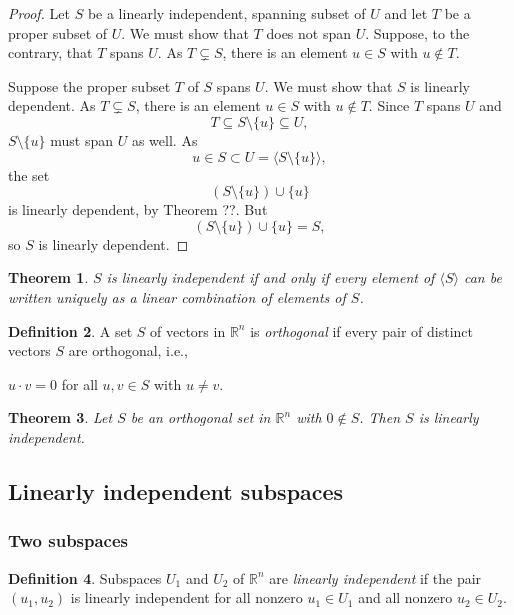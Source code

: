 \documentclass{amsart}
\newcommand{\RR}{\mathbb{R}}
\newtheorem{theorem}{Theorem}[section]
\theoremstyle{definition}
\newtheorem{definition}[theorem]{Definition}
\begin{document}
\begin{proof}
Let $S$ be a linearly independent, spanning subset of $U$ and let $T$ be a proper subset of $U$.
We must show that $T$ does not span $U$.
Suppose, to the contrary, that $T$ spans $U$.
As $T\subsetneq S$, there is an element $u\in S$ with $u\notin T$.


Suppose the proper subset $T$ of $S$ spans $U$.
We must show that $S$ is linearly dependent.
As $T\subsetneq S$, there is an element $u\in S$ with $u\notin T$.
Since $T$ spans $U$ and
$$T\subseteq S\setminus \{u\}\subseteq U,$$
$S\setminus \{u\}$ must span $U$ as well.
As $$u\in S\subset U = \langle S\setminus \{u\}\rangle,$$
the set
\[
\left(S\setminus \{u\}\right)\cup \{u\}
\]
is linearly dependent, by Theorem ??.
But
\[
\left(S\setminus \{u\}\right)\cup \{u\}=S,
\]
so $S$ is linearly dependent.
\end{proof}


\begin{theorem}
  $S$ is linearly independent if and only if every element of $\langle S\rangle$ can be written uniquely as a linear combination of elements of $S$.
\end{theorem}

\begin{definition}
  A set $S$ of vectors in $\RR^n$ is \emph{orthogonal} if every pair of distinct vectors $S$ are orthogonal, i.e.,
  \begin{center}
    $u\cdot v = 0$ for all $u, v\in S$ with $u\neq v$.
  \end{center}
\end{definition}

\begin{theorem}
  Let $S$ be an orthogonal set in $\RR^n$ with $0\notin S$.
  Then $S$ is linearly independent.
\end{theorem}

\subsection{Linearly independent subspaces}
\subsubsection{Two subspaces}

\begin{definition}
  Subspaces $U_1$ and $U_2$ of $\RR^n$ are \emph{linearly independent} if the pair $(u_1, u_2)$ is linearly independent for all nonzero $u_1\in U_1$ and all nonzero $u_2\in U_2$.
\end{definition}
\end{document}
